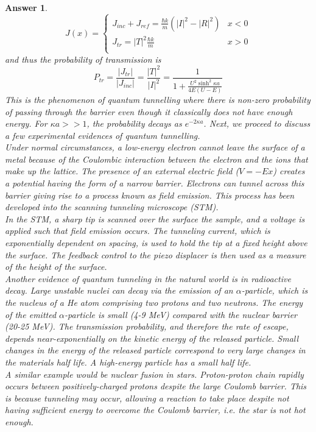 \documentclass[a4paper]{article}
\newtheorem{ans}{Answer}[subsection]
\theoremstyle{new}
\begin{document}
\begin{ans}
$$J(x)=
\left\{
        \begin{array}{ll}
      J_{inc}+J_{ref}=\frac{\hbar k}{m}(|I|^2-|R|^2)& x<0\\
J_{tr}=|T|^2\frac{\hbar k}{m}& x>0\\
        \end{array}
    \right.
$$
and thus the probability of transmission is
$$P_{tr}=\frac{|J_{tr}|}{|J_{inc}|}=\frac{|T|^2}{|I|^2}=\frac{1}{1+\frac{U^2\sinh^2\kappa a}{4E(U-E)}}$$
This is the phenomenon of quantum tunnelling where there is non-zero probability of passing through the barrier even though it classically does not have enough energy. For $\kappa a>>1$, the probability decays as $e^{-2\kappa a}$. Next, we proceed to discuss a few experimental evidences of quantum tunnelling.\\[5pt]
Under normal circumstances, a low-energy electron cannot leave the surface of a metal because of the Coulombic interaction between the electron and the ions that make up the lattice.
The presence of an external electric field ($V =-Ex$) creates a potential having the form of a narrow barrier. Electrons can tunnel across this barrier giving rise to a process known as field emission. This process has been developed into the scanning tunneling microscope (STM).\\[5pt]
In the STM, a sharp tip is scanned over the surface the sample, and a voltage is applied such that field emission occurs. The tunneling current, which is exponentially dependent on spacing, is used to hold the tip at a fixed height above the surface. The feedback control to the piezo displacer is then used as a measure of the height of the surface.\\[5pt]
Another evidence of quantum tunneling in the natural world is in radioactive decay. Large unstable nuclei can decay via the emission of an $\alpha$-particle, which is the nucleus of a He atom comprising two protons and two neutrons. The energy of the emitted $\alpha$-particle is small (4-9 MeV) compared with the nuclear barrier (20-25 MeV). The transmission probability, and therefore the rate of escape, depends near-exponentially on the kinetic energy of the released particle. Small changes in the energy of the released particle correspond to very large changes in the materials half life. A high-energy particle has a small half life.\\[5pt]
A similar example would be nuclear fusion in stars. Proton-proton chain rapidly occurs between positively-charged protons despite the large Coulomb barrier. This is because tunneling may occur, allowing a reaction to take place despite not having sufficient energy to overcome the Coulomb barrier, i.e. the star is not hot enough.
\end{ans}
\newpage
\end{document}
